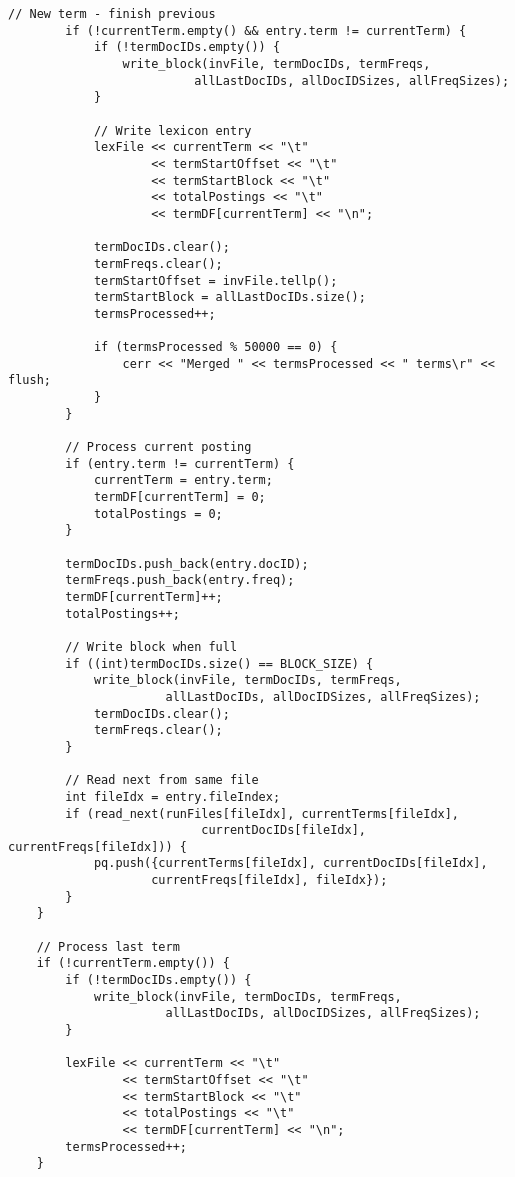 \documentclass{article}
\begin{document}
\begin{lstlisting}[caption={The complete source code for the merger component.}, label={lst:merger}]
        // New term - finish previous
        if (!currentTerm.empty() && entry.term != currentTerm) {
            if (!termDocIDs.empty()) {
                write_block(invFile, termDocIDs, termFreqs, 
                          allLastDocIDs, allDocIDSizes, allFreqSizes);
            }
            
            // Write lexicon entry
            lexFile << currentTerm << "\t" 
                    << termStartOffset << "\t"
                    << termStartBlock << "\t"
                    << totalPostings << "\t"
                    << termDF[currentTerm] << "\n";
            
            termDocIDs.clear();
            termFreqs.clear();
            termStartOffset = invFile.tellp();
            termStartBlock = allLastDocIDs.size();
            termsProcessed++;
            
            if (termsProcessed % 50000 == 0) {
                cerr << "Merged " << termsProcessed << " terms\r" << flush;
            }
        }
        
        // Process current posting
        if (entry.term != currentTerm) {
            currentTerm = entry.term;
            termDF[currentTerm] = 0;
            totalPostings = 0;
        }
        
        termDocIDs.push_back(entry.docID);
        termFreqs.push_back(entry.freq);
        termDF[currentTerm]++;
        totalPostings++;
        
        // Write block when full
        if ((int)termDocIDs.size() == BLOCK_SIZE) {
            write_block(invFile, termDocIDs, termFreqs,
                      allLastDocIDs, allDocIDSizes, allFreqSizes);
            termDocIDs.clear();
            termFreqs.clear();
        }
        
        // Read next from same file
        int fileIdx = entry.fileIndex;
        if (read_next(runFiles[fileIdx], currentTerms[fileIdx], 
                           currentDocIDs[fileIdx], currentFreqs[fileIdx])) {
            pq.push({currentTerms[fileIdx], currentDocIDs[fileIdx], 
                    currentFreqs[fileIdx], fileIdx});
        }
    }
    
    // Process last term
    if (!currentTerm.empty()) {
        if (!termDocIDs.empty()) {
            write_block(invFile, termDocIDs, termFreqs,
                      allLastDocIDs, allDocIDSizes, allFreqSizes);
        }
        
        lexFile << currentTerm << "\t" 
                << termStartOffset << "\t"
                << termStartBlock << "\t"
                << totalPostings << "\t"
                << termDF[currentTerm] << "\n";
        termsProcessed++;
    }
    

\end{lstlisting}
\end{document}
